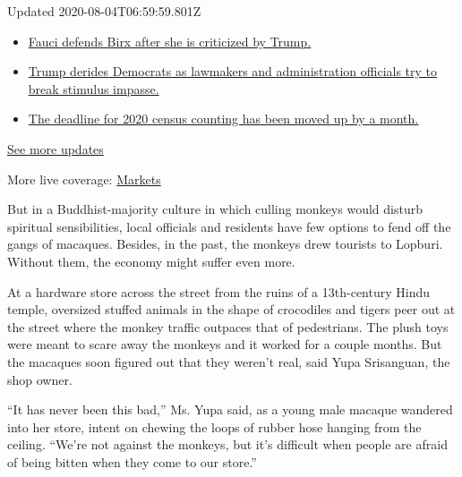 Updated 2020-08-04T06:59:59.801Z

\begin{itemize}
\tightlist
\item
  \href{https://www.nytimes.com/2020/08/03/world/coronavirus-covid-19.html?action=click\&pgtype=Article\&state=default\&region=MAIN_CONTENT_1\&context=storylines_live_updates\#link-4547638f}{Fauci
  defends Birx after she is criticized by Trump.}
\item
  \href{https://www.nytimes.com/2020/08/03/world/coronavirus-covid-19.html?action=click\&pgtype=Article\&state=default\&region=MAIN_CONTENT_1\&context=storylines_live_updates\#link-15e7f995}{Trump
  derides Democrats as lawmakers and administration officials try to
  break stimulus impasse.}
\item
  \href{https://www.nytimes.com/2020/08/03/world/coronavirus-covid-19.html?action=click\&pgtype=Article\&state=default\&region=MAIN_CONTENT_1\&context=storylines_live_updates\#link-e5a2cda}{The
  deadline for 2020 census counting has been moved up by a month.}
\end{itemize}

\href{https://www.nytimes.com/2020/08/03/world/coronavirus-covid-19.html?action=click\&pgtype=Article\&state=default\&region=MAIN_CONTENT_1\&context=storylines_live_updates}{See
more updates}

More live coverage:
\href{https://www.nytimes.com/live/2020/08/03/business/stock-market-today-coronavirus?action=click\&pgtype=Article\&state=default\&region=MAIN_CONTENT_1\&context=storylines_live_updates}{Markets}

But in a Buddhist-majority culture in which culling monkeys would
disturb spiritual sensibilities, local officials and residents have few
options to fend off the gangs of macaques. Besides, in the past, the
monkeys drew tourists to Lopburi. Without them, the economy might suffer
even more.

At a hardware store across the street from the ruins of a 13th-century
Hindu temple, oversized stuffed animals in the shape of crocodiles and
tigers peer out at the street where the monkey traffic outpaces that of
pedestrians. The plush toys were meant to scare away the monkeys and it
worked for a couple months. But the macaques soon figured out that they
weren't real, said Yupa Srisanguan, the shop owner.

``It has never been this bad,'' Ms. Yupa said, as a young male macaque
wandered into her store, intent on chewing the loops of rubber hose
hanging from the ceiling. ``We're not against the monkeys, but it's
difficult when people are afraid of being bitten when they come to our
store.''

